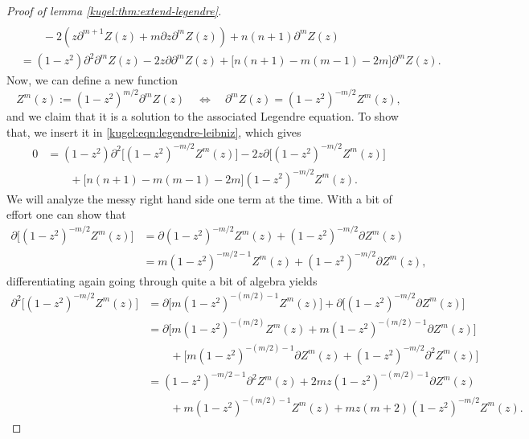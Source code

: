 \begin{proof}[Proof of lemma \ref{kugel:thm:extend-legendre}]
\begin{align}
    \nonumber \\
    &\qquad - 2 \left(
      z \partial^{m+1} Z(z)
      + m\partial z \partial^m Z(z)
    \right)
    + n(n+1) \partial^m Z(z)
    \nonumber \\
    &= (1-z^2) \partial^2 \partial^m Z(z)
    - 2z \partial \partial^m Z(z)
    + \bigl[ n(n + 1) - m(m-1) - 2m \bigr] \partial^m Z(z).
    \label{kugel:eqn:legendre-leibniz}
  \end{align}
  Now, we can define a new function
  \begin{equation*}
    Z^m(z) := (1-z^2)^{m/2} \partial^m Z(z)
    \quad \iff \quad
    \partial^m Z(z) = (1-z^2)^{-m/2} Z^m(z),
  \end{equation*}
  and we claim that it is a solution to the associated Legendre equation. To
  show that, we insert it in \eqref{kugel:eqn:legendre-leibniz}, which gives
  \begin{align}
    0 &= (1-z^2) \partial^2 \bigl[ (1-z^2)^{-m/2} Z^m(z) \bigr]
    - 2z\partial \bigl[ (1-z^2)^{-m/2} Z^m(z) \bigr] \nonumber \\
    &\qquad + \bigl[ n(n + 1) - m(m-1) - 2m \bigr] (1-z^2)^{-m/2} Z^m(z).
    \label{kugel:eqn:legendre-zm}
  \end{align}
  We will analyze the messy right hand side one term at the time. With a bit of
  effort one can show that
  \begin{align*}
    \partial \bigl[ (1-z^2)^{-m/2} Z^m(z) \bigr]
      &= \partial (1 - z^2)^{-m/2} Z^m(z) + (1 - z^2)^{-m/2} \partial Z^m(z) \\
      &= m(1 - z^2)^{-m/2 -1} Z^m(z) + (1 - z^2)^{-m/2} \partial Z^m(z),
  \end{align*}
  differentiating again going through quite a bit of algebra yields
  \begin{align*}
    \partial^2 \bigl[ (1-z^2)^{-m/2} Z^m(z) \bigr]
      &= \partial \bigl[ m(1-z^2)^{-(m/2)-1} Z^m(z) \bigr]
        + \partial \bigl[ (1-z^2)^{-m/2} \partial Z^m(z) \bigr] \\
      &= \partial \bigl[ m(1-z^2)^{-(m/2)} Z^m(z)
        + m(1-z^2)^{-(m/2)-1} \partial Z^m(z) \bigr] \\
        &\qquad + \bigl[ m(1-z^2)^{-(m/2)-1} \partial Z^m(z)
        + (1-z^2)^{-m/2} \partial^2 Z^m(z) \bigl] \\
      &= (1-z^2)^{-m/2-1} \partial^2 Z^m(z)
        + 2mz(1-z^2)^{-(m/2) -1} \partial Z^m(z) \\
        &\qquad + m (1-z^2)^{-(m/2)-1} Z^m(z) 
        + m z(m+2)(1-z^2)^{-m/2} Z^m(z).

\end{align*}
\end{proof}
